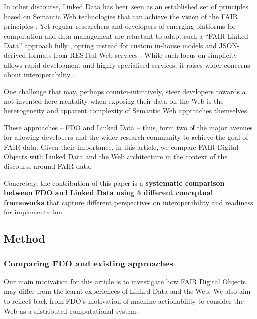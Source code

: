 In other discourse, Linked Data \cite{Bizer 2009} has been seen as an established set of principles based on Semantic Web technologies that can achieve the vision of the FAIR principles \cite{boninodasilvasantosFAIRDataPoints2016a,Hasnain 2018}. Yet regular researchers and developers of emerging platforms for computation and data management are reluctant to adapt such a ``FAIR Linked Data'' approach fully \cite{verborghSemanticWebIdentity2020a}, opting instead for custom in-house models and JSON-derived formats from RESTful Web services \cite{merono-penuelaConclusionFutureChallenges2021a,neumannAnalysisPublicREST2021a}. While such focus on simplicity allows rapid development and highly specialised services, it raises wider concerns about interoperability \cite{turcoaneLinkedDataJSONLD2014a,wilkinsonWorkflowsWhenParts2022b}.

One challenge that may, perhaps counter-intuitively, steer developers towards a not-invented-here mentality \cite{stefiDevelopersMakeUnbiased2015,stefiDevelopReuseTwo2015a} when exposing their data on the Web is the heterogeneity and apparent complexity of Semantic Web approaches themselves \cite{merono-penuelaWebDataApis2021b}.

These approaches -- FDO and Linked Data -- thus, form two of the major avenues for allowing developers and the wider research community to achieve the goal of FAIR data. Given their importance, in this article, we compare FAIR Digital Objects with Linked Data and the Web architecture in the context of the discourse around FAIR data.

Concretely, the contribution of this paper is a {\bf systematic comparison between FDO and Linked Data using 5 different conceptual frameworks} that capture different perspectives on interoperability and readiness for implementation.

\subsection{Method}\label{ch3:method}

\subsubsection{Comparing FDO and existing approaches}\label{ch3:comparing}

Our main motivation for this article is to investigate how FAIR Digital Objects may differ from the learnt experiences of Linked Data and the Web. We also aim to reflect back from FDO's motivation of machine-actionability to consider the Web as a distributed computational system.

